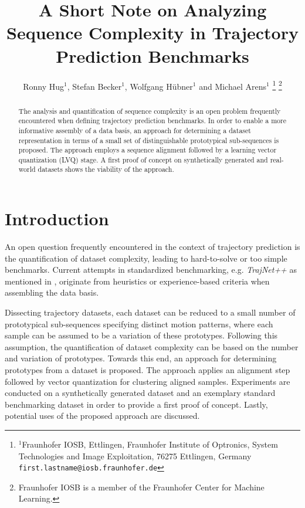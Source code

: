\documentclass[letterpaper, 10 pt, conference]{ieeeconf}  %
\title{\LARGE \bf
	A Short Note on Analyzing Sequence Complexity in Trajectory Prediction Benchmarks	
}
\author{Ronny Hug$^{1}$, Stefan Becker$^{1}$, Wolfgang H\"ubner$^{1}$ and Michael Arens$^{1}$%
	\thanks{$^{1}$Fraunhofer IOSB, Ettlingen, Fraunhofer Institute of Optronics, System Technologies and Image Exploitation, 76275 Ettlingen, Germany
		{\tt\small first.lastname@iosb.fraunhofer.de}}%
	\thanks{Fraunhofer IOSB is a member of the Fraunhofer Center for Machine Learning.}%
}
\begin{document}
	
\maketitle
\thispagestyle{empty}
\pagestyle{empty}


\begin{abstract}
	
The analysis and quantification of sequence complexity is an open problem frequently encountered when defining trajectory prediction benchmarks.
In order to enable a more informative assembly of a data basis, an approach for determining a dataset representation in terms of a small set of distinguishable prototypical sub-sequences is proposed.
The approach employs a sequence alignment followed by a learning vector quantization (LVQ) stage.
A first proof of concept on synthetically generated and real-world datasets shows the viability of the approach.

\end{abstract}


\section{Introduction} 
An open question frequently encountered in the context of trajectory prediction is the quantification of dataset complexity, leading to hard-to-solve or too simple benchmarks.
Current attempts in standardized benchmarking, e.g. \emph{TrajNet++} as mentioned in \cite{rudenko2019human}, originate from heuristics or experience-based criteria when assembling the data basis.

Dissecting trajectory datasets, each dataset can be reduced to a small number of prototypical sub-sequences specifying distinct motion patterns, where each sample can be assumed to be a variation of these prototypes. %
Following this assumption, the quantification of dataset complexity can be based on the number and variation of prototypes.
Towards this end, an approach for determining prototypes from a dataset is proposed.
The approach applies an alignment step followed by vector quantization for clustering aligned samples. 
Experiments are conducted on a synthetically generated dataset and an exemplary standard benchmarking dataset in order to provide a first proof of concept.
Lastly, potential uses of the proposed approach are discussed.
\end{document}
